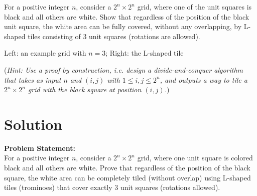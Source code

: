 \documentclass[11pt]{article}
\begin{document}
    \begin{tcolorbox}[title={Problem 3 (Grid Tiling, 35 pts)}]
        For a positive integer $n$, consider a $2^n \times 2^n$ grid, where one of the unit squares is black and all others are white. Show that regardless of the position of the black unit square, the white area can be fully covered, without any overlapping, by L-shaped tiles consisting of $3$ unit squares (rotations are allowed).
        
        \bigskip
        
        {
        \centering
        
        Left: an example grid with $n=3$; Right: the L-shaped tile
        
        }

        \bigskip
        
        (\emph{Hint: Use a proof by construction, i.e. design a divide-and-conquer algorithm that takes as input $n$ and $(i,j)$ with $1\leq i,j \leq 2^n$, and outputs a way to tile a $2^n\times 2^n$ grid with the black square at position $(i,j)$.}) 
        \medskip

             
    \end{tcolorbox}
    \section*{Solution}

    \textbf{Problem Statement:} \\
    For a positive integer \( n \), consider a \( 2^n \times 2^n \) grid, where one unit square is colored black and all others are white. Prove that regardless of the position of the black square, the white area can be completely tiled (without overlap) using L-shaped tiles (trominoes) that cover exactly 3 unit squares (rotations allowed).
    
    \bigskip
    
\end{document}
